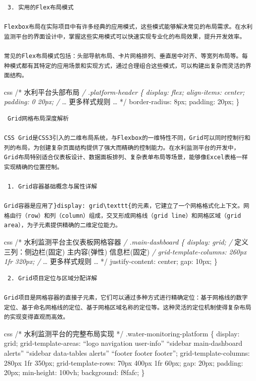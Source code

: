\begin{lstlisting}
 3. 实用的Flex布局模式

Flexbox布局在实际项目中有许多经典的应用模式，这些模式能够解决常见的布局需求。在水利监测平台的界面设计中，掌握这些实用模式可以快速实现专业化的布局效果，提升开发效率。

常见的Flex布局模式包括：头部导航布局、卡片网格排列、垂直居中对齐、等宽列布局等。每种模式都有其特定的应用场景和实现方式，通过合理组合这些模式，可以构建出复杂而灵活的界面结构。
\end{lstlisting}

css /* 水利平台头部布局 \emph{/ .platform-header \{ display: flex; align-items: center; padding: 0 20px; /} \ldots{} 更多样式规则 \ldots{} */ border-radius: 8px; padding: 20px; \}

\begin{lstlisting}
 Grid网格布局深度解析

CSS Grid是CSS3引入的二维布局系统，与Flexbox的一维特性不同，Grid可以同时控制行和列的布局，为创建复杂页面结构提供了强大而精确的控制能力。在水利监测平台的开发中，Grid布局特别适合仪表板设计、数据面板排列、复杂表单布局等场景，能够像Excel表格一样实现精确的位置控制。

 1. Grid容器基础概念与属性详解

Grid容器是应用了}display: grid\texttt{的元素，它建立了一个网格格式化上下文。网格由行（row）和列（column）组成，交叉形成网格线（grid line）和网格区域（grid area），为子元素提供精确的二维定位能力。
\end{lstlisting}

css /* 水利监测平台主仪表板网格容器 \emph{/ .main-dashboard \{ display: grid; /} 定义三列：侧边栏(固定) 主内容(弹性) 信息栏(固定) \emph{/ grid-template-columns: 260px 1fr 320px; /} \ldots{} 更多样式规则 \ldots{} */ justify-content: center; gap: 10px; \}

\begin{lstlisting}
 2. Grid项目定位与区域分配详解

Grid项目是网格容器的直接子元素，它们可以通过多种方式进行精确定位：基于网格线的数字定位、基于命名网格线的定位、基于网格区域名称的定位等。这种灵活的定位机制使得复杂布局的实现变得直观而高效。
\end{lstlisting}

css /* 水利监测平台的完整布局实现 */ .water-monitoring-platform \{ display: grid; grid-template-areas: ``logo navigation user-info'' ``sidebar main-dashboard alerts'' ``sidebar data-tables alerts'' ``footer footer footer''; grid-template-columns: 280px 1fr 350px; grid-template-rows: 70px 400px 1fr 60px; gap: 20px; padding: 20px; min-height: 100vh; background: f8fafc; \}

